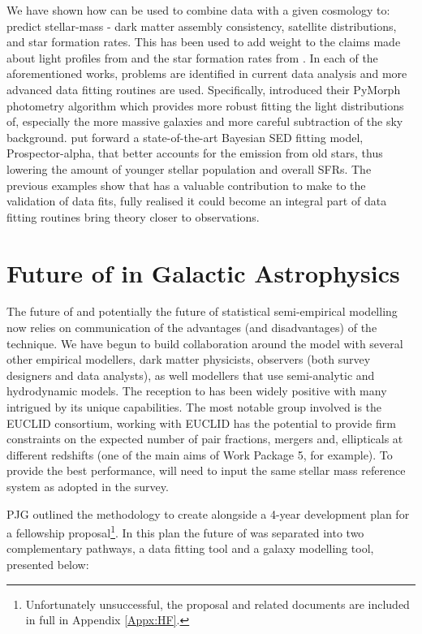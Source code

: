 We have shown how \steel can be used to combine data with a given cosmology to: predict stellar-mass - dark matter assembly consistency, satellite distributions, and star formation rates. This has been used to add weight to the claims made about light profiles from \citet{Bernardi2017ComparingLight} and the star formation rates from \citet{Leja2019AnSurvey}. In each of the aforementioned works, problems are identified in current data analysis and more advanced data fitting routines are used. Specifically, \citet{Bernardi2017ComparingLight}  introduced their PyMorph photometry algorithm which provides more robust fitting the light distributions of, especially the more massive galaxies and more careful subtraction of the sky background. \citet{Leja2019AnSurvey} put forward a state-of-the-art Bayesian SED fitting model, Prospector-alpha, that better accounts for the emission from old stars, thus lowering the amount of younger stellar population and overall SFRs. The previous examples show that \steel has a valuable contribution to make to the validation of data fits, fully realised it could become an integral part of data fitting routines bring theory closer to observations.

\section{Future of \steel in Galactic Astrophysics}
\label{sec:Future}

The future of \steel and potentially the future of statistical semi-empirical modelling now relies on communication of the advantages (and disadvantages) of the technique. We have begun to build collaboration around the model with several other empirical modellers, dark matter physicists, observers (both survey designers and data analysts), as well modellers that use semi-analytic and hydrodynamic models. The reception to \steel has been widely positive with many intrigued by its unique capabilities. The most notable group involved is the EUCLID consortium, working with EUCLID \steel has the potential to provide firm constraints on the expected number of pair fractions, mergers and, ellipticals at different redshifts (one of the main aims of Work Package 5, for example). To provide the best performance, \steel will need to input the same stellar mass reference system as adopted in the survey.

PJG outlined the methodology to create \steel alongside a 4-year development plan for a fellowship proposal\footnote{Unfortunately unsuccessful, the proposal and related documents are included in full in Appendix \ref{Appx:HF}.}. In this plan the future of \steel was separated into two complementary pathways, a data fitting tool and a galaxy modelling tool, presented below:

